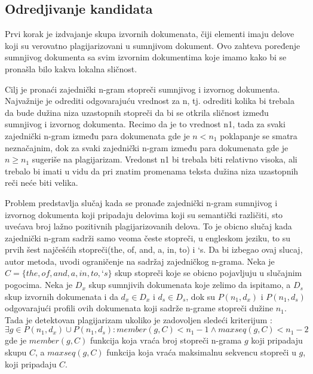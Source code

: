 \documentclass[a4paper]{article}
\begin{document}
\subsection{Odredjivanje kandidata}
\label{subsec:odredjivanje kandidata}

Prvi korak je izdvajanje skupa izvornih dokumenata, čiji elementi imaju delove koji su verovatno 
plagijarizovani u sumnjivom dokument. Ovo zahteva poređenje sumnjivog dokumenta sa svim izvornim  dokumentima koje imamo kako bi se pronašla bilo kakva lokalna sličnost.


\par Cilj je pronaći zajednički n-gram stopreči sumnjivog i izvornog dokumenta. Najvažnije je odrediti odgovarajuću vrednost za n, tj. odrediti kolika bi trebala da bude dužina niza uzastopnih stopreči da bi se otkrila sličnost između  sumnjivog i izvornog dokumenta. Recimo da je to vrednost n1, tada za svaki  zajednički n-gram između para dokumenata gde je \( n < n_{1} \)  poklapanje se smatra neznačajnim, dok za svaki zajednički n-gram između para dokumenata gde je \( n \geq n_{1} \)  sugeriše na plagijarizam. Vredonst n1 bi trebala biti relativno visoka, ali trebalo bi imati u vidu da pri znatim promenama teksta dužina niza uzastopnih reči neće biti velika. 

\par Problem predstavlja slučaj kada se pronađe zajednički n-gram sumnjivog i izvornog dokumenta   koji pripadaju delovima koji su semantički različiti, sto uvećava broj lažno pozitivnih plagijarizovanih delova. To je obicno slučaj kada zajednički n-gram sadrži samo veoma česte stopreči, u engleskom jeziku, to su prvih šest najčešćih stopreči(the, of, and, a, in, to) i ‘s. 
Da bi izbegao ovaj slucaj, autor metoda, uvodi ograničenje na sadržaj zajedničkog n-grama. Neka je \( C = \{the, of, and, a, in, to,‘s\} \) skup stopreči koje se obicno pojavljuju u slučajnim pogocima. Neka je \(D_{x}\) skup sumnjivih dokumenata koje zelimo da ispitamo, a \(D_{s}\) skup  izvornih dokumenata i da \(d_{x} \in D_{x}\) i \(d_{s} \in D_{s}\), dok su \(P(n_{1},d_{x})\) i \(P(n_{1},d_{s})\) odgovarajući profili ovih dokumenata koji sadrže n-grame stopreči dužine \(n_{1}\). Tada je detektovan plagijarizam ukoliko je zadovoljen sledeći kriterijum : 
	\[ \exists g \in P(n_{1} ,d_{x}) \cup P(n_{1} ,d_{s} ): member(g,C)<n_{1}-1 \land maxseq(g,C)<n_{1}-2 \]
gde je \( member(g,C)\) funkcija koja vraća broj stopreči n-grama \(g\) koji pripadaju skupu \(C\), a \(maxseq(g,C)\) funkcija koja vraća maksimalnu sekvencu stopreči u \(g\), koji pripadaju \(C\).
\end{document}
